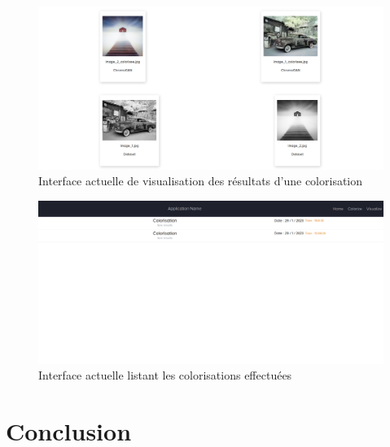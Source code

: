 \documentclass{article}
\begin{document}
\begin{figure}[!h]
    \centering
    \includegraphics[width=15cm]{img/interface-visualisation.png}
    \caption{Interface actuelle de visualisation des résultats d'une colorisation}
    \label{fig:visualisation}
\end{figure}

\begin{figure}[!h]
    \centering
    \includegraphics[width=15cm]{img/choix-resultat.png}
    \caption{Interface actuelle listant les colorisations effectuées}
    \label{fig:choix}
\end{figure}

\newpage
\section{Conclusion}
\end{document}
